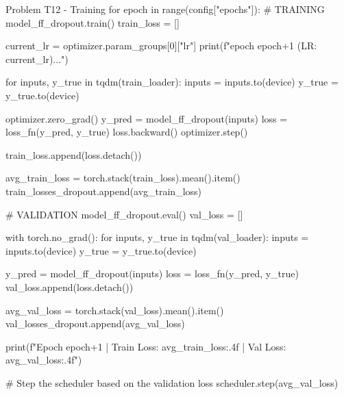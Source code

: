 \documentclass[12pt, a4paper]{article}
\begin{document}
            \begin{codeblock}{Problem T12 - Training}
                for epoch in range(config["epochs"]):
                    # TRAINING
                    model_ff_dropout.train()
                    train_loss = []
                    
                    current_lr = optimizer.param_groups[0]["lr"]
                    print(f"\nTraining epoch {epoch+1} (LR: {current_lr})...")
                    
                    for inputs, y_true in tqdm(train_loader):
                        inputs = inputs.to(device)
                        y_true = y_true.to(device)
                        
                        optimizer.zero_grad()
                        y_pred = model_ff_dropout(inputs)
                        loss = loss_fn(y_pred, y_true)
                        loss.backward()
                        optimizer.step()
                        
                        train_loss.append(loss.detach())
                        
                    avg_train_loss = torch.stack(train_loss).mean().item()
                    train_losses_dropout.append(avg_train_loss)

                    # VALIDATION
                    model_ff_dropout.eval()
                    val_loss = []
                    
                    with torch.no_grad():
                        for inputs, y_true in tqdm(val_loader):
                            inputs = inputs.to(device)
                            y_true = y_true.to(device)
                            
                            y_pred = model_ff_dropout(inputs)
                            loss = loss_fn(y_pred, y_true)
                            val_loss.append(loss.detach())
                            
                    avg_val_loss = torch.stack(val_loss).mean().item()
                    val_losses_dropout.append(avg_val_loss)

                    print(f"Epoch {epoch+1} | Train Loss: {avg_train_loss:.4f} | Val Loss: {avg_val_loss:.4f}")

                    # Step the scheduler based on the validation loss
                    scheduler.step(avg_val_loss)
            \end{codeblock}
\end{document}
